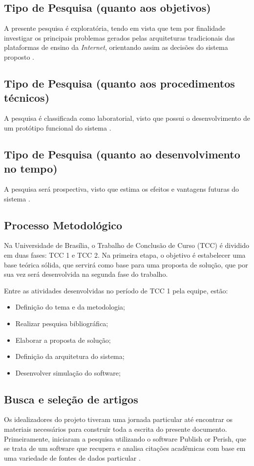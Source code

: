 \subsection{Tipo de Pesquisa (quanto aos objetivos)}
A presente pesquisa é exploratória, tendo em vista que tem por finalidade investigar os principais problemas gerados pelas arquiteturas tradicionais das plataformas de ensino da \textit{Internet}, orientando assim as decisões do sistema proposto \cite{fontelles2009}.

\subsection{Tipo de Pesquisa (quanto aos procedimentos técnicos)}
A pesquisa é classificada como laboratorial, visto que possui o desenvolvimento de um protótipo funcional do sistema \cite{fontelles2009}.

\subsection{Tipo de Pesquisa (quanto ao desenvolvimento no tempo)}
A pesquisa será prospectiva, visto que estima os efeitos e vantagens futuras do sistema \cite{fontelles2009}.

\subsection{Processo Metodológico}
Na Universidade de Brasília, o Trabalho de Conclusão de Curso (TCC) é dividido em duas fases: TCC 1 e TCC 2. Na primeira etapa, o objetivo é estabelecer uma base teórica sólida, que servirá como base para uma proposta de solução, que por sua vez será desenvolvida na segunda fase do trabalho.

Entre as atividades desenvolvidas no período de TCC 1 pela equipe, estão:
\begin{itemize}
    \item Definição do tema e da metodologia;
    \item Realizar pesquisa bibliográfica;
    \item Elaborar a proposta de solução;
    \item Definição da arquitetura do sistema;
    \item Desenvolver simulação do software;
\end{itemize}

\subsection{Busca e seleção de artigos}
Os idealizadores do projeto tiveram uma jornada particular até encontrar os materiais necessários para construir toda a escrita do presente documento. Primeiramente, iniciaram a pesquisa utilizando o software Publish or Perish, que se trata de um software que recupera e analisa citações acadêmicas com base em uma variedade de fontes de dados particular \cite{harzing2025publish}.

